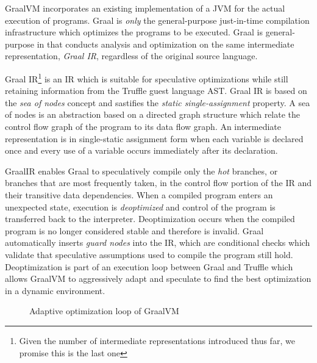 GraalVM incorporates an existing implementation of a JVM\cite{java:hotspot} for the actual execution of programs.
Graal is \textit{only} the general-purpose just-in-time compilation infrastructure which optimizes the programs to be executed.
Graal is general-purpose in that conducts analysis and optimization on the same intermediate representation, \textit{Graal IR}, regardless of the original source language.

Graal IR\cite{graalvm:ir}\footnote{Given the number of intermediate representations introduced thus far, we promise this is the last one} is an IR which is suitable for speculative optimizations while still retaining information from the Truffle guest language AST.
Graal IR is based on the \textit{sea of nodes} concept\cite{click:sea-of-nodes} and sastifies the \textit{static single-assignment}\cite{ssa} property.
A sea of nodes is an abstraction based on a directed graph structure which relate the control flow graph\cite{allen:ctrl-flow-analysis} of the program to its data flow graph\cite{allen:data-flow-analysis}.
An intermediate representation is in single-static assignment form when each variable is declared once and every use of a variable occurs immediately after its declaration\cite{johnson:use-def-chains}.


GraalIR enables Graal to speculatively compile only the \textit{hot} branches\cite{graalvm:speculative-ir}, or branches that are most frequently taken, in the control flow portion of the IR and their transitive data dependencies.
When a compiled program enters an unexpected state, execution is \textit{deoptimized}\cite{self:deoptimization} and control of the program is transferred back to the interpreter.
Deoptimization occurs when the compiled program is no longer considered stable and therefore is invalid.
Graal automatically inserts \textit{guard nodes} into the IR, which are conditional checks which validate that speculative assumptions used to compile the program still hold.
Deoptimization is part of an execution loop between Graal and Truffle which allows GraalVM to aggressively adapt and speculate to find the best optimization in a dynamic environment.

\begin{figure}[!htb]
	\centering
	\caption{Adaptive optimization loop of GraalVM}
\end{figure}

